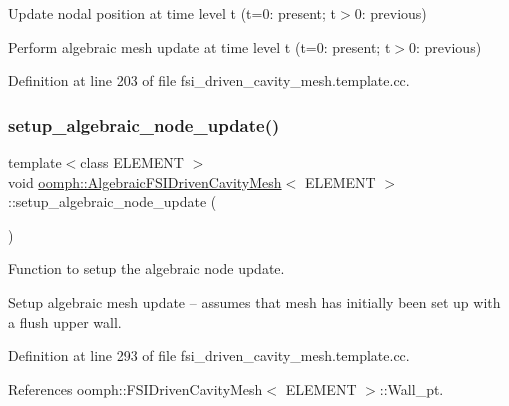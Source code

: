 Update nodal position at time level t (t=0\+: present; t$>$0\+: previous) 

Perform algebraic mesh update at time level t (t=0\+: present; t$>$0\+: previous) 

Definition at line 203 of file fsi\+\_\+driven\+\_\+cavity\+\_\+mesh.\+template.\+cc.

\mbox{\label{classoomph_1_1AlgebraicFSIDrivenCavityMesh_a7f6b7c3dae1c61c2cdb0cbd229173114}} 
\subsubsection{\texorpdfstring{setup\+\_\+algebraic\+\_\+node\+\_\+update()}{setup\_algebraic\_node\_update()}}
{\footnotesize\ttfamily template$<$class E\+L\+E\+M\+E\+NT $>$ \\
void \hyperlink{classoomph_1_1AlgebraicFSIDrivenCavityMesh}{oomph\+::\+Algebraic\+F\+S\+I\+Driven\+Cavity\+Mesh}$<$ E\+L\+E\+M\+E\+NT $>$\+::setup\+\_\+algebraic\+\_\+node\+\_\+update (\begin{DoxyParamCaption}{ }\end{DoxyParamCaption})\hspace{0.3cm}{\ttfamily [protected]}}



Function to setup the algebraic node update. 

Setup algebraic mesh update -- assumes that mesh has initially been set up with a flush upper wall. 

Definition at line 293 of file fsi\+\_\+driven\+\_\+cavity\+\_\+mesh.\+template.\+cc.



References oomph\+::\+F\+S\+I\+Driven\+Cavity\+Mesh$<$ E\+L\+E\+M\+E\+N\+T $>$\+::\+Wall\+\_\+pt.

\mbox{\label{classoomph_1_1AlgebraicFSIDrivenCavityMesh_a87d34d6cf84c62a9049773451c664176}} 
